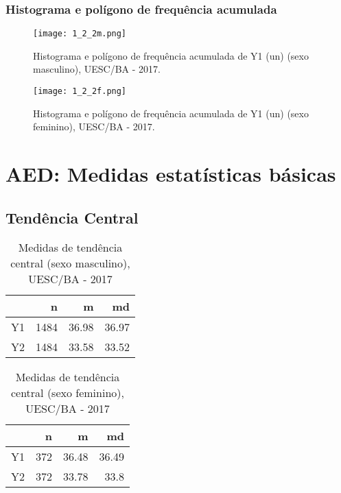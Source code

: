 \documentclass[a4paper, 10pt]{article}
\begin{document}
			\subsubsection{Histograma e polígono de frequência acumulada}
				\begin{figure}[!htb]
					\texttt{[image: 1\_2\_2m.png]}
					\caption{Histograma e polígono de frequência acumulada de Y1 (un) (sexo masculino), UESC/BA - 2017.}
				\end{figure}
				\begin{figure}[!htb]
					\texttt{[image: 1\_2\_2f.png]}
					\caption{Histograma e polígono de frequência acumulada de Y1 (un) (sexo feminino), UESC/BA - 2017.}
				\end{figure} \newpage
	\section{AED: Medidas estatísticas básicas}
		\subsection{Tendência Central}
			\begin{table}[!htb]
				\caption{Medidas de tendência central (sexo masculino), UESC/BA - 2017}
				\begin{tabular}{crrr}
					\hline
					& n & m & md \\
					\hline
					Y1 & 1484 & 36.98 & 36.97 \\
					Y2 & 1484 & 33.58 & 33.52 \\
					\hline
				\end{tabular}
			\end{table}
			\begin{table}[!htb]
				\caption{Medidas de tendência central (sexo feminino), UESC/BA - 2017}
				\begin{tabular}{crrr}
					\hline
					& n & m & md \\
					\hline
					Y1 & 372 & 36.48 & 36.49 \\
					Y2 & 372 & 33.78 & 33.8 \\
					\hline
				\end{tabular}
			\end{table}
\end{document}
